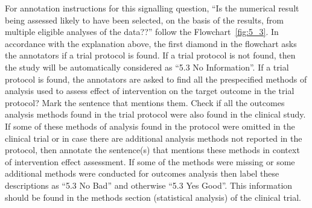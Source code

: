 \documentclass[sn-mathphys,Numbered]{sn-jnl}%
\begin{document}
For annotation instructions for this signalling question, ``Is the numerical result being assessed likely to have been selected, on the basis of the results, from multiple eligible analyses of the data??'' follow the Flowchart~\ref{fig:5_3}.
In accordance with the explanation above, the first diamond in the flowchart asks the annotators if a trial protocol is found.
If a trial protocol is not found, then the study will be automatically considered as ``5.3 No Information''.
If a trial protocol is found, the annotators are asked to find all the prespecified methods of analysis used to assess effect of intervention on the target outcome in the trial protocol?
Mark the sentence that mentions them.
Check if all the outcomes analysis methods found in the trial protocol were also found in the clinical study.
If some of these  methods of analysis found in the protocol were omitted in the clinical trial or in case there are additional analysis methods not reported in the protocol, then annotate the sentence(s) that mentions these methods in context of intervention effect assessment.
If some of the methods were missing or some additional methods were conducted for outcomes analysis then label these descriptions as ``5.3 No Bad'' and otherwise ``5.3 Yes Good''.
This information should be found in the methods section (statistical analysis) of the clinical trial.
%
%
%
%



%
%
%
%
\end{document}
